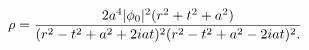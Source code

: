 \begin{equation}
\rho = 
{
2 a^4 |\phi_0|^2 (r^2+t^2+a^2)
\over
(r^2-t^2+a^2+2iat)^2(r^2-t^2+a^2-2iat)^2.
}
\end{equation}

